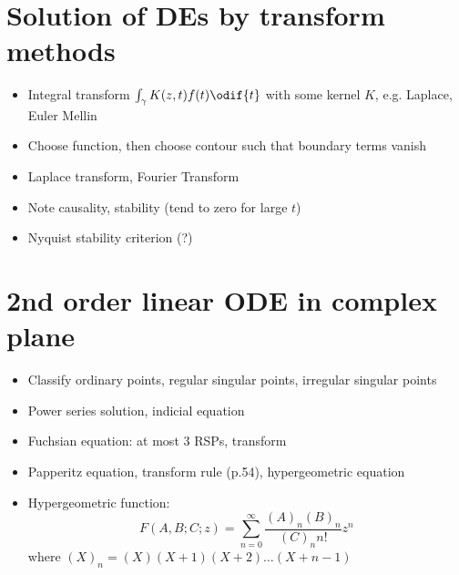 \section{Solution of DEs by transform methods}
\begin{itemize}
    \item Integral transform $\int_\gamma K(z,t)f(t) \odif{t}$ with some kernel $K$, e.g. Laplace, Euler Mellin
    \item Choose function, then choose contour such that boundary terms vanish
    \item Laplace transform, Fourier Transform
    \item Note causality, stability (tend to zero for large $t$)
    \item Nyquist stability criterion (?)
\end{itemize}
\section{2nd order linear ODE in complex plane}
\begin{itemize}
    \item Classify ordinary points, regular singular points, irregular singular points
    \item Power series solution, indicial equation
    \item Fuchsian equation: at most 3 RSPs, transform
    \item Papperitz equation, transform rule (p.54), hypergeometric equation
    \item Hypergeometric function: 
    \[F(A,B;C;z) = \sum_{n=0}^\infty \frac{(A)_n (B)_n}{(C)_n n!}z^n\]
    where $(X)_n = (X)(X+1)(X+2)\dots (X+n-1)$
\end{itemize}
